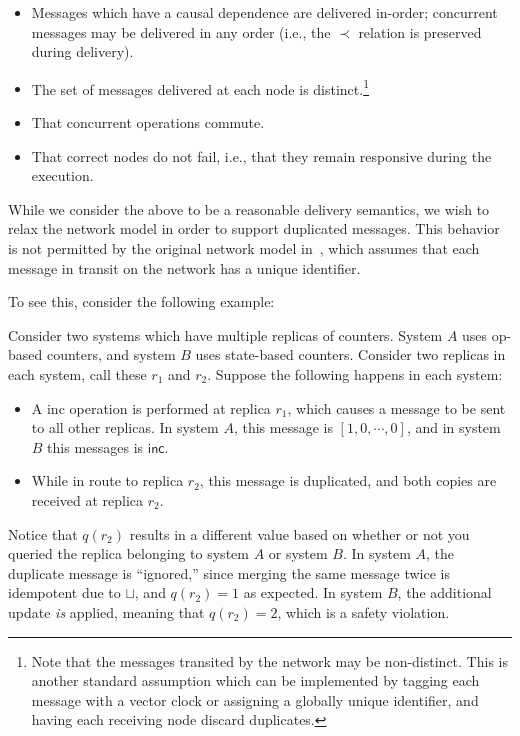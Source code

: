 \begin{itemize}
  \item Messages which have a causal dependence are delivered in-order;
    concurrent messages may be delivered in any order (i.e., the $\prec$
    relation is preserved during delivery).
  \item The set of messages delivered at each node is distinct.\footnote{Note
    that the messages transited by the network may be non-distinct. This is
    another standard assumption which can be implemented by tagging each message
    with a vector clock or assigning a globally unique identifier, and having
    each receiving node discard duplicates.}
  \item That concurrent operations commute.
  \item That correct nodes do not fail, i.e., that they remain responsive during
    the execution.
\end{itemize}

While we consider the above to be a reasonable delivery semantics, we wish to
relax the network model in order to support duplicated messages. This
behavior is not permitted by the original network model in~\citet{gomes17},
which assumes that each message in transit on the network has a unique
identifier.

To see this, consider the following example:

\begin{example}
  \label{example:state-op-dup-msgs}
  Consider two systems which have multiple replicas of \CRDT counters. System
  $A$ uses op-based counters, and system $B$ uses state-based counters. Consider
  two replicas in each system, call these $r_1$ and $r_2$. Suppose the following
  happens in each system:

  \begin{itemize}
    \item A \textsf{inc} operation is performed at replica $r_1$, which causes a
      message to be sent to all other replicas. In system $A$, this message is
      $[1, 0, \cdots, 0]$, and in system $B$ this messages is $\textsf{inc}$.
    \item While in route to replica $r_2$, this message is duplicated, and both
      copies are received at replica $r_2$.
  \end{itemize}

  Notice that $q(r_2)$ results in a different value based on whether or not you
  queried the replica belonging to system $A$ or system $B$. In system $A$, the
  duplicate message is ``ignored,'' since merging the same message twice is
  idempotent due to $\sqcup$, and $q(r_2) = 1$ as expected. In system $B$, the
  additional update \emph{is} applied, meaning that $q(r_2) = 2$, which is a
  safety violation.
\end{example}

